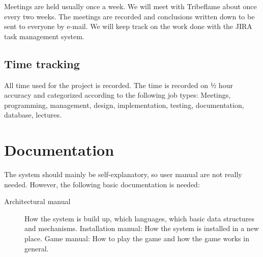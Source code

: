 \documentclass[12pt,a4paper]{article}
\begin{document}
Meetings are held usually once a week. We will meet with Tribeflame
about once every two weeks. The meetings are recorded and conclusions
written down to be sent to everyone by e-mail.  We will keep track on
the work done with the JIRA task management system.

\subsection{Time tracking}

All time used for the project is recorded.  The time is recorded on ½
hour accuracy and categorized according to the following job types:
Meetings, programming, management, design, implementation, testing,
documentation, database, lectures.

\section{Documentation}

The system should mainly be self-explanatory, so user manual are not
really needed. However, the following basic documentation is needed:

\begin{description}
\item[Architectural manual] How the system is build up, which languages,
which basic data structures and mechanisms.  Installation manual: How
the system is installed in a new place.  Game manual: How to play the
game and how the game works in general.
\end{description}
\end{document}
